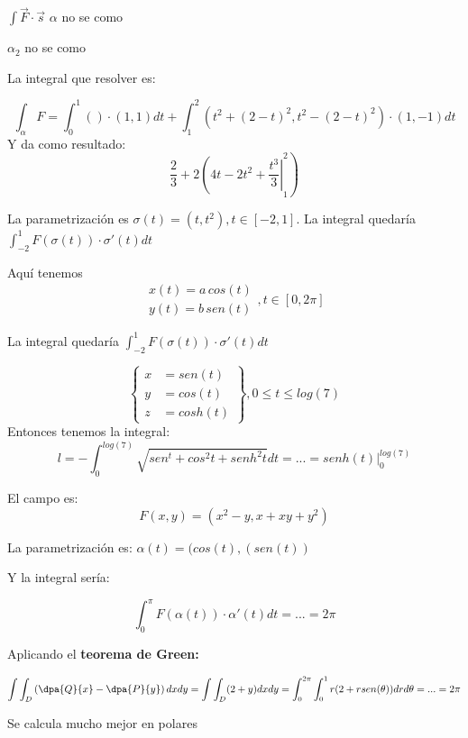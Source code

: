 \begin{problem}[4]

$\displaystyle\int \overrightarrow{F}\cdot \overrightarrow{s}$
\ppart $\alpha$ no se como

\ppart $\alpha_2$ no se como

\solution
\spart
La integral que resolver es:

\[
\int_{\alpha} F = \int_{0}^{1} () \cdot (1,1)dt + \int_{1}^{2} (t^2+(2-t)^2,t^2-(2-t)^2)\cdot(1,-1)dt
\]
Y da como resultado:
\[
\frac{2}{3} + 2\left.\left(4t-2t^2+\frac{t^3}{3}\right|_1^2\right)
\]

\spart
La parametrización es $\sigma(t) = (t,t^2), t\in[-2,1]$.
La integral quedaría $\displaystyle \int_{-2}^{1} F(\sigma(t))\cdot \sigma'(t)dt$

\spart
Aquí tenemos \[\begin{array}{cc}
x(t)= a\,cos(t)\\
y(t)= b\, sen(t)
\end{array}, t\in[0,2\pi]
\]

La integral quedaría $\displaystyle \int_{-2}^{1} F(\sigma(t))\cdot \sigma'(t)dt$

\end{problem}

\begin{problem}[5]
\[
\left\{\begin{array}{cc}x&=sen(t)\\y&=cos(t)\\z&=cosh(t)\end{array}\right\}, 0\leq t \leq log(7)
\]
\solution
Entonces tenemos la integral:
\[
l = -\int_0^{log(7)} \sqrt{sen^t+cos^2t+senh^2t} dt = ... = \left.senh(t)\right|_0^{log(7)}
\]
\end{problem}

\begin{problem}[6]
El campo es: \[F(x,y) = (x^2-y,x+xy+y^2)\]

\solution

La parametrización es: $\alpha(t) = (cos(t),(sen(t))$

Y la integral sería:

\[
\int_0^{\pi} F(\alpha(t))\cdot\alpha'(t) dt = ... = 2\pi
\]

Aplicando el \textbf{teorema de Green:}

\[
\int\int_D \left(\dpa{Q}{x} - \dpa{P}{y}\right) dxdy = \int\int_D  (2+y)dxdy = \int_0^{2\pi} \int_0^1 r(2+rsen(\theta))drd\theta = ... = 2\pi
\]

Se calcula mucho mejor en polares

\end{problem}

